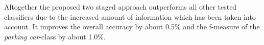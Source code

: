 Altogether the proposed two staged approach outperforms all other tested classifiers due to the increased amount of information which has been taken into account. It improves the overall accuracy by about 0.5\% and the f-measure of the \emph{parking car}-class by about 1.0\%. 







